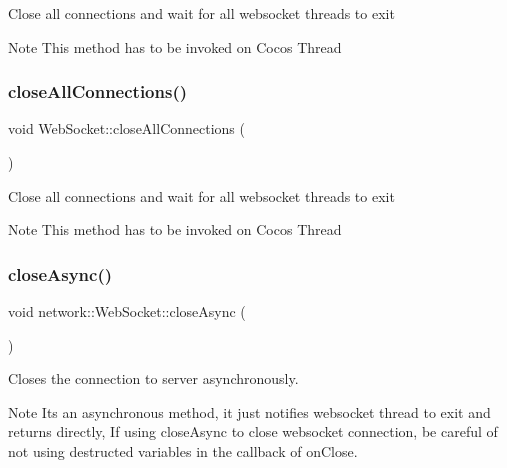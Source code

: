 Close all connections and wait for all websocket threads to exit \begin{DoxyNote}{Note}
This method has to be invoked on Cocos Thread 
\end{DoxyNote}
\mbox{\label{classnetwork_1_1WebSocket_a3e2130b9d28fffa6dbb00eee933ff914}} 
\subsubsection{\texorpdfstring{close\+All\+Connections()}{closeAllConnections()}\hspace{0.1cm}{\footnotesize\ttfamily [2/2]}}
{\footnotesize\ttfamily void Web\+Socket\+::close\+All\+Connections (\begin{DoxyParamCaption}{ }\end{DoxyParamCaption})\hspace{0.3cm}{\ttfamily [static]}}

Close all connections and wait for all websocket threads to exit \begin{DoxyNote}{Note}
This method has to be invoked on Cocos Thread 
\end{DoxyNote}
\mbox{\label{classnetwork_1_1WebSocket_a39bdbc192e1e9120f042b695ac0344bc}} 
\subsubsection{\texorpdfstring{close\+Async()}{closeAsync()}\hspace{0.1cm}{\footnotesize\ttfamily [1/2]}}
{\footnotesize\ttfamily void network\+::\+Web\+Socket\+::close\+Async (\begin{DoxyParamCaption}{ }\end{DoxyParamCaption})}



Closes the connection to server asynchronously. 

\begin{DoxyNote}{Note}
It\textquotesingle{}s an asynchronous method, it just notifies websocket thread to exit and returns directly, If using \textquotesingle{}close\+Async\textquotesingle{} to close websocket connection, be careful of not using destructed variables in the callback of \textquotesingle{}on\+Close\textquotesingle{}. 
\end{DoxyNote}
\mbox{\label{classnetwork_1_1WebSocket_a3dd9f7d124fcb82f69c4a7114c1ed9bc}} 
